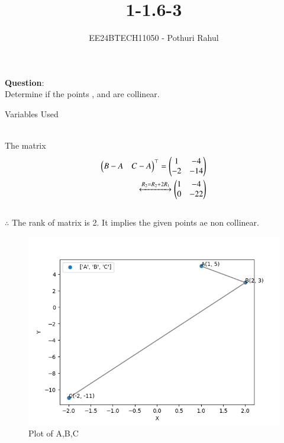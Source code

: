 \documentclass[journal]{IEEEtran}
\begin{document}

\vspace{3cm}

\title{1-1.6-3}
\author{EE24BTECH11050 - Pothuri Rahul}
{\let\newpage\relax\maketitle}

\renewcommand{\thefigure}{\theenumi}
\renewcommand{\thetable}{\theenumi}
\setlength{\intextsep}{10pt} %


\renewcommand{\thetable}{\theenumi}
\textbf{Question}:\\
Determine if the points  ,  and  are collinear. \\
\solution 
\begin{table}[h!]
    \centering
    
    \caption{Variables Used}
    \label{tab:1.6-3}
\end{table}
\\

The matrix
\begin{align}
\begin{pmatrix}B-A & C-A\end{pmatrix}^\top=\begin{pmatrix}1 & -4 \\ -2 & -14\end{pmatrix}\\
\xleftrightarrow{R_2 =R_2 +2R_1} 
\begin{pmatrix}1 & -4 \\ 0 & -22 \end{pmatrix}
\end{align}
\\
$\therefore$
The rank of matrix is 2. It implies the given points ae non collinear.
\begin{figure}[h]
    \centering
    \includegraphics[width=\columnwidth]{figs/fig.png}
    \caption{Plot of A,B,C}
 \end{figure}
\end{document}
